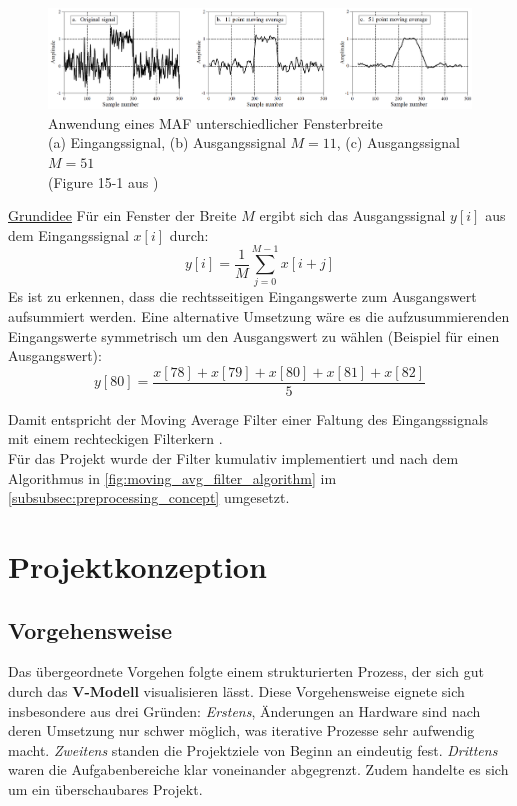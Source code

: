 \documentclass[a4paper, portrait, 12pt]{scrartcl} %
\begin{document}
\begin{figure}[H]
	\centering
    \includegraphics[scale=0.65]{moving_average_filter_signal_smith.png} 
	\caption{\centering Anwendung eines MAF unterschiedlicher Fensterbreite\\
				\footnotesize
				(a) Eingangssignal, (b) Ausgangssignal $M=11$, (c) Ausgangssignal $M=51$\\				(Figure 15-1 aus \cite[S. 279]{Smith1999})}
	\label{fig:mov_avg_filter_signal}
\end{figure}

\underline{Grundidee}
Für ein Fenster der Breite $M$ ergibt sich das Ausgangssignal $y[i]$ aus dem Eingangssignal $x[i]$ durch:
\begin{equation}
	y[i]=\frac{1}{M}\sum_{j=0}^{M-1}x[i+j]
\end{equation}
Es ist zu erkennen, dass die rechtsseitigen Eingangswerte zum Ausgangswert aufsummiert werden. Eine alternative Umsetzung wäre es die aufzusummierenden Eingangswerte symmetrisch um den Ausgangswert zu wählen (Beispiel für einen Ausgangswert):
\begin{equation}
	y[80]=\frac{x[78]+x[79]+x[80]+x[81]+x[82]}{5}
\end{equation}

Damit entspricht der Moving Average Filter einer Faltung des Eingangssignals mit einem rechteckigen Filterkern \cite[S. 277f]{Smith1999}.\\

Für das Projekt wurde der Filter kumulativ implementiert und nach dem Algorithmus in \autoref{fig:moving_avg_filter_algorithm} im \autoref{subsubsec:preprocessing_concept} umgesetzt.

\section{Projektkonzeption}
\subsection{Vorgehensweise}
Das übergeordnete Vorgehen folgte einem strukturierten Prozess, der sich gut durch das \textbf{V-Modell} visualisieren lässt. Diese Vorgehensweise eignete sich insbesondere aus drei Gründen: \emph{Erstens}, Änderungen an Hardware sind nach deren Umsetzung nur schwer möglich, was iterative Prozesse sehr aufwendig macht. \emph{Zweitens} standen die Projektziele von Beginn an eindeutig fest. \emph{Drittens} waren die Aufgabenbereiche klar voneinander abgegrenzt. Zudem handelte es sich um ein überschaubares Projekt.
\end{document}

